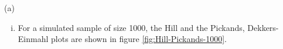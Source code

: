 \documentclass{report}
\begin{document}
\begin{enumerate}[1.]
\begin{enumerate}{(a)}
\begin{enumerate}[(i)]
    \item For a simulated sample of size 1000, the Hill and the
      Pickands, Dekkers-Einmahl plots are shown in figure
      \ref{fig:Hill-Pickands-1000}.
      \begin{figure}[htb!]
        \centering
        \subfigure[sample size 100, $\var(\xi^{(H)})$ = 0.1019, $\var(\xi^{(P)})$ = 2.8868]{
}
\end{figure}
\end{enumerate}
\end{enumerate}
\end{enumerate}
\end{document}
